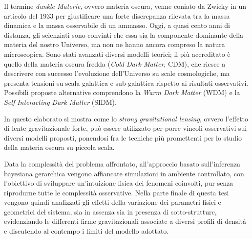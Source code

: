 Il termine \emph{dunkle Materie}, ovvero materia oscura, venne coniato da Zwicky in un articolo del 1933 per giustificare una forte discrepanza rilevata tra la massa dinamica e la massa osservabile di un ammasso. 
Oggi, a quasi cento anni di distanza, gli scienziati sono convinti che essa sia la componente dominante della materia del nostro Universo, ma non ne hanno ancora compreso la natura microscopica. Sono stati avanzati diversi modelli teorici; il più accreditato è quello della materia oscura fredda (\emph{Cold Dark Matter}, CDM), che riesce a descrivere con successo l'evoluzione dell'Universo su scale cosmologiche, ma presenta tensioni su scala galattica e sub-galattica rispetto ai risultati osservativi. Possibili proposte alternative comprendono la \emph{Warm Dark Matter} (WDM) e la \emph{Self Interacting Dark Matter} (SIDM). 

In questo elaborato si mostra come lo \emph{strong gravitational lensing}, ovvero l'effetto di lente gravitazionale forte, può essere utilizzato per porre vincoli osservativi sui diversi modelli proposti, ponendosi fra le tecniche più promettenti per lo studio della materia oscura su piccola scala.

Data la complessità del problema affrontato, all'approccio basato sull'inferenza bayesiana gerarchica vengono affiancate simulazioni in ambiente controllato, con l'obiettivo di sviluppare un'intuizione fisica dei fenomeni coinvolti, pur senza riprodurne tutte le complessità osservative. Nella parte finale di questa tesi vengono quindi analizzati gli effetti della variazione dei parametri fisici e geometrici del sistema, sia in assenza sia in presenza di sotto-strutture, evidenziando le differenti firme gravitazionali associate a diversi profili di densità e discutendo al contempo i limiti del modello adottato.